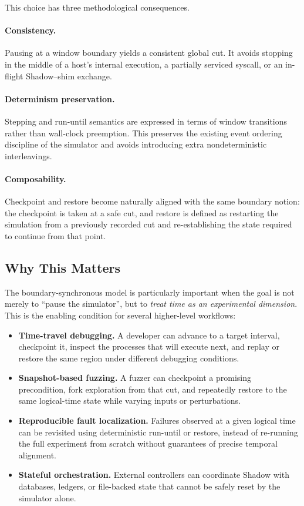 \documentclass[11pt,a4paper]{article}
\begin{document}
This choice has three methodological consequences.

\paragraph{Consistency.}
Pausing at a window boundary yields a consistent global cut. It avoids stopping
in the middle of a host's internal execution, a partially serviced syscall,
or an in-flight Shadow--shim exchange.

\paragraph{Determinism preservation.}
Stepping and run-until semantics are expressed in terms of window transitions
rather than wall-clock preemption. This preserves the existing event ordering
discipline of the simulator and avoids introducing extra nondeterministic
interleavings.

\paragraph{Composability.}
Checkpoint and restore become naturally aligned with the same boundary notion:
the checkpoint is taken at a safe cut, and restore is defined as restarting
the simulation from a previously recorded cut and re-establishing the state
required to continue from that point.

\subsection{Why This Matters}

The boundary-synchronous model is particularly important when the goal is not
merely to ``pause the simulator'', but to \emph{treat time as an experimental
dimension}. This is the enabling condition for several higher-level workflows:

\begin{itemize}[leftmargin=1.7em]
  \item \textbf{Time-travel debugging.} A developer can advance to a target
  interval, checkpoint it, inspect the processes that will execute next, and
  replay or restore the same region under different debugging conditions.
  \item \textbf{Snapshot-based fuzzing.} A fuzzer can checkpoint a promising
  precondition, fork exploration from that cut, and repeatedly restore to the
  same logical-time state while varying inputs or perturbations.
  \item \textbf{Reproducible fault localization.} Failures observed at a given
  logical time can be revisited using deterministic run-until or restore,
  instead of re-running the full experiment from scratch without guarantees of
  precise temporal alignment.
  \item \textbf{Stateful orchestration.} External controllers can coordinate
  Shadow with databases, ledgers, or file-backed state that cannot be safely
  reset by the simulator alone.
\end{itemize}
\end{document}
